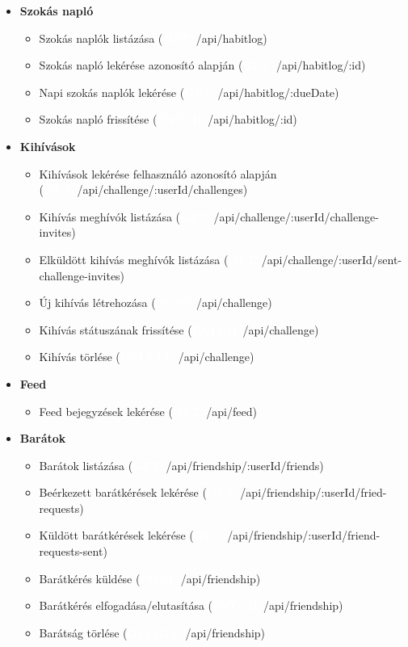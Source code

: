\documentclass[12pt]{report}
\newcommand{\httpGet}[1]{\colorbox{getColor}{\textbf{\textcolor{white}{GET}}}~#1}
\newcommand{\httpPost}[1]{\colorbox{postColor}{\textbf{\textcolor{white}{POST}}}~#1}
\newcommand{\httpPatch}[1]{\colorbox{patchColor}{\textbf{\textcolor{white}{PATCH}}}~#1}
\newcommand{\httpDelete}[1]{\colorbox{deleteColor}{\textbf{\textcolor{white}{DELETE}}}~#1}
\begin{document}
\begin{itemize}
\begin{itemize}
      \item Negatív szokások listázása (\httpGet{/api/habit/negative/:userId})
      \item Negatív szokás léztrehozása (\httpPost{/api/habit/negative})
      \item Negatív szokás módosítása (\httpPatch{/api/habit/negative/:id})
      \item Negatív szokás törlése (\httpDelete{/api/habit/negative/:id})
    \end{itemize}
  \item \textbf{Szokás napló}
    \begin{itemize}
      \item Szokás naplók listázása (\httpGet{/api/habitlog})
      \item Szokás napló lekérése azonosító alapján (\httpGet{/api/habitlog/:id})
      \item Napi szokás naplók lekérése (\httpGet{/api/habitlog/:dueDate})
      \item Szokás napló frissítése (\httpPatch{/api/habitlog/:id})
    \end{itemize}
  \item \textbf{Kihívások}
    \begin{itemize}
      \item Kihívások lekérése felhasználó azonosító alapján (\httpGet{/api/challenge/:userId/challenges})
      \item Kihívás meghívók listázása (\httpGet{/api/challenge/:userId/challenge-invites})
      \item Elküldött kihívás meghívók listázása (\httpGet{/api/challenge/:userId/sent-challenge-invites})
      \item Új kihívás létrehozása (\httpPost{/api/challenge})
      \item Kihívás státuszának frissítése (\httpPatch{/api/challenge})
      \item Kihívás törlése (\httpDelete{/api/challenge})
    \end{itemize}
  \item \textbf{Feed}
    \begin{itemize}
      \item Feed bejegyzések lekérése (\httpGet{/api/feed})        
    \end{itemize}
  \item \textbf{Barátok}
    \begin{itemize}
      \item Barátok listázása (\httpGet{/api/friendship/:userId/friends})
      \item Beérkezett barátkérések lekérése (\httpGet{/api/friendship/:userId/fried-requests})
      \item Küldött barátkérések lekérése (\httpGet{/api/friendship/:userId/friend-requests-sent})
      \item Barátkérés küldése (\httpPost{/api/friendship})
      \item Barátkérés elfogadása/elutasítása (\httpPatch{/api/friendship})
      \item Barátság törlése (\httpDelete{/api/friendship})
    \end{itemize}
\end{itemize}
\end{document}
